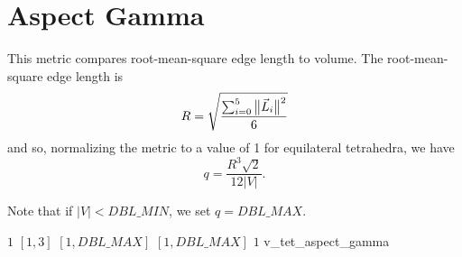 \section{Aspect Gamma}

This metric compares root-mean-square edge length to volume.
The root-mean-square edge length is
\[
R = \sqrt{\frac{\sum_{i=0}^{5}\big\lVert{\vec L_i}\big\rVert^2}{6}}
\]
and so, normalizing the metric to a value of 1 for equilateral tetrahedra, we have
\[
q = \frac{R^3\sqrt{2}}{12|V|}.
\]

Note that if  $|V| < DBL\_MIN$, we set $q = DBL\_MAX$.

%
{$1$}%
{$[1,3]$}%
{$[1,DBL\_MAX]$}%
{$[1,DBL\_MAX]$}%
{$1$}%
{\cite{par:93}}%
{v\_tet\_aspect\_gamma}%

